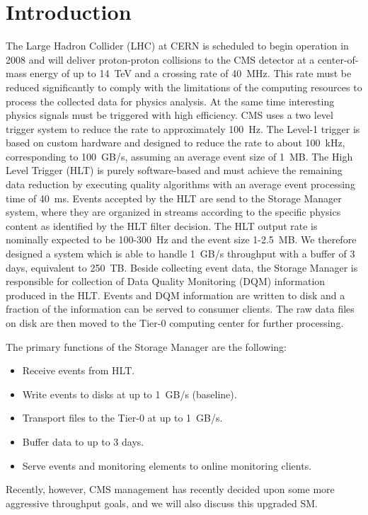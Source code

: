 
\section{\label{sec:intro}Introduction}

The Large Hadron Collider (LHC) at CERN is scheduled to begin operation in 2008 
and will deliver proton-proton collisions to the CMS detector at a center-of-mass energy 
of up to 14~TeV and a crossing rate of 40~MHz. 
This rate must be reduced significantly to comply with the limitations of the computing resources to process the collected data for physics analysis. 
At the same time interesting physics signals must be triggered with high efficiency. 
CMS uses a two level trigger system to reduce the rate to approximately 100~Hz. 
The Level-1 trigger is based on custom hardware and designed to reduce the rate to about 100~kHz, corresponding to 100~GB/s, assuming an average event size of 1~MB. 
The High Level Trigger (HLT) is purely software-based and  must achieve the remaining data reduction by executing quality algorithms with an average event processing time of 40~ms. 
Events accepted by the HLT are send to the Storage Manager system, where they are organized in streams according to the specific physics content as identified by the HLT filter decision. 
The HLT output rate is nominally expected to be 100-300~Hz and the event size 1-2.5~MB. 
We therefore designed a system which is able to handle 1~GB/s throughput with a buffer of 3 days, 
equivalent to 250~TB.
Beside collecting event data, the Storage Manager is responsible for collection of Data Quality Monitoring (DQM) information produced in the HLT. 
Events and DQM information are written to disk and a fraction of the information can be served to consumer clients. 
The raw data files on disk are then moved to the Tier-0 computing center for further processing. 

The primary functions of the Storage Manager are the following:
\begin{itemize}
\item Receive events from HLT.
\item Write events to disks at up to 1~GB/s (baseline).
\item Transport files to the Tier-0 at up to 1~GB/s.
\item Buffer data to up to 3 days.
\item Serve events and monitoring elements to online monitoring clients.
\end{itemize}

Recently, however, CMS management has recently decided upon some more aggressive throughput goals,
and we will also discuss this upgraded SM. 
